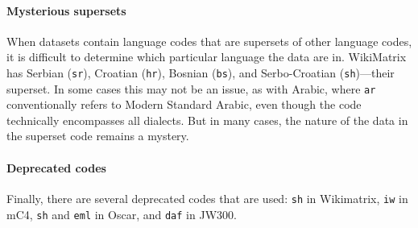 \paragraph{Mysterious supersets}
When datasets contain language codes that are supersets of other language codes, it is difficult to determine which particular language the data are in. WikiMatrix has Serbian (\texttt{sr}), Croatian (\texttt{hr}), Bosnian (\texttt{bs}), and Serbo-Croatian (\texttt{sh})---their superset. %
In some cases this may not be an issue, as with Arabic, where \texttt{ar} conventionally refers to Modern Standard Arabic, even though the code technically encompasses all dialects.
But in many cases, the nature of the data in the superset code remains a mystery.


\paragraph{Deprecated codes} Finally, there are several deprecated codes that are used: \texttt{sh} in Wikimatrix, \texttt{iw} in mC4, \texttt{sh} and \texttt{eml} in Oscar, and \texttt{daf} in JW300.



